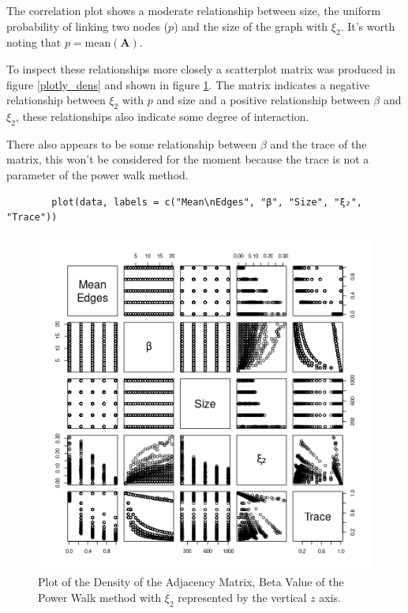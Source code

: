 \documentclass[11pt]{report}
\begin{document}
The correlation plot shows a moderate relationship between size, the uniform probability of linking two nodes (\(p\)) and the size of the graph with \(\xi_{2}\). It's worth noting that \(p = \mathrm{mean}\left(\mathbf{A}\right)\).

To inspect these relationships more closely a scatterplot matrix was produced in
figure \ref{plotly_dens} and shown in figure \ref{fig:plotly_dens}. The matrix indicates a
negative relationship between \(\xi_{2}\) with \(p\) and size and a positive
relationship between \(\beta\) and \(\xi_{2}\), these relationships also indicate some degree of interaction.


There also appears to be some relationship between \(\beta\) and the trace of the matrix, this won't be considered for the moment because the trace is not a parameter of the power walk method.

\begin{listing}[htbp]
    \begin{tcolorbox}
        \begin{verbatim}
        plot(data, labels = c("Mean\nEdges", "β", "Size", "ξ₂", "Trace"))
        \end{verbatim}
    \end{tcolorbox}
\caption{\label{plotly_dens} Plot Model Diagnostics for data corresponding to graphs, see figure \ref{fig:plotly_dens}}
\end{listing}


\begin{figure}[htbp]
\centering
\includegraphics[width=12cm]{media/cor_matrix-er.png}
\caption{\label{fig:plotly_dens}Plot of the Density of the Adjacency Matrix, Beta Value of the Power Walk method with \(\xi_{2}\) represented by the vertical \(z\) axis.}
\end{figure}
\end{document}
